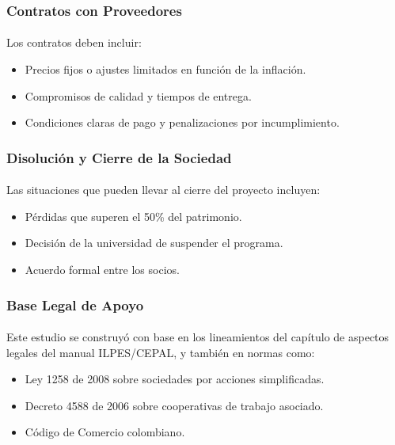 \documentclass[letterpaper, 11pt]{report}
\begin{document}
\subsubsection{Contratos con Proveedores}
\paragraph{}
Los contratos deben incluir:
\begin{itemize}
      \item Precios fijos o ajustes limitados en función de la inflación.
      \item Compromisos de calidad y tiempos de entrega.
      \item Condiciones claras de pago y penalizaciones por incumplimiento.
\end{itemize}

\subsubsection{Disolución y Cierre de la Sociedad}
\paragraph{}
Las situaciones que pueden llevar al cierre del proyecto incluyen:
\begin{itemize}
      \item Pérdidas que superen el 50\% del patrimonio.
      \item Decisión de la universidad de suspender el programa.
      \item Acuerdo formal entre los socios.
\end{itemize}

\subsubsection{Base Legal de Apoyo}
\paragraph{}
Este estudio se construyó con base en los lineamientos del capítulo de aspectos legales del manual ILPES/CEPAL, y también en normas como:
\begin{itemize}
      \item Ley 1258 de 2008 sobre sociedades por acciones simplificadas.
      \item Decreto 4588 de 2006 sobre cooperativas de trabajo asociado.
      \item Código de Comercio colombiano.
\end{itemize}
\end{document}
